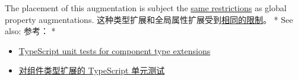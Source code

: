 \begin{paracol}{2}
The placement of this augmentation is subject the
\href{https://vuejs.org/guide/typescript/options-api.html\#type-augmentation-placement}{same
restrictions} as global property augmentations.
\switchcolumn
这种类型扩展和全局属性扩展受到\href{https://cn.vuejs.org/guide/typescript/options-api.html\#type-augmentation-placement}{相同的限制}。
\switchcolumn[0]*%
See also:
\switchcolumn
参考：
\switchcolumn[0]*%
\begin{itemize}
\item
  \href{https://github.com/vuejs/core/blob/main/packages/dts-test/componentTypeExtensions.test-d.tsx}{TypeScript
  unit tests for component type extensions}
\end{itemize}
\switchcolumn
\begin{itemize}
\item
  \href{https://github.com/vuejs/core/blob/main/packages/dts-test/componentTypeExtensions.test-d.tsx}{对组件类型扩展的
  TypeScript 单元测试}
\end{itemize}
\end{paracol}

\begin{paracol}{2} 

\end{paracol}


\begin{paracol}{2} 

\end{paracol}